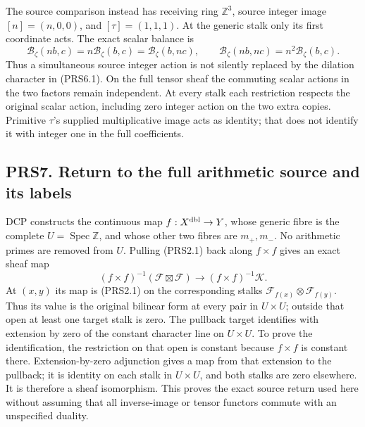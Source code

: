 The source comparison instead has receiving ring \(\mathbb Z^3\), source
integer image \([n]=(n,0,0)\), and \([\tau]=(1,1,1)\). At the generic
stalk only its first coordinate acts. The exact scalar balance is \[
\mathcal B_\zeta(nb,c)=n\mathcal B_\zeta(b,c)=\mathcal B_\zeta(b,nc),\qquad
\mathcal B_\zeta(nb,nc)=n^2\mathcal B_\zeta(b,c).
\tag{PRS6.2}
\] Thus a simultaneous source integer action is not silently replaced by
the dilation character in (PRS6.1). On the full tensor sheaf the
commuting scalar actions in the two factors remain independent. At every
stalk each restriction respects the original scalar action, including
zero integer action on the two extra copies. Primitive \(\tau\)'s
supplied multiplicative image acts as identity; that does not identify
it with integer one in the full coefficients.

\subsection{PRS7. Return to the full arithmetic source and its
labels}\label{prs7.-return-to-the-full-arithmetic-source-and-its-labels}

DCP constructs the continuous map \(f:X^{\rm dbl}\to Y\), whose generic
fibre is the complete \(U=\operatorname{Spec}\mathbb Z\), and whose
other two fibres are \(m_+,m_-\). No arithmetic primes are removed from
\(U\). Pulling (PRS2.1) back along \(f\times f\) gives an exact sheaf
map \[
(f\times f)^{-1}(\mathcal F\boxtimes\mathcal F)
\longrightarrow(f\times f)^{-1}\mathcal K.
\tag{PRS7.1}
\] At \((x,y)\) its map is (PRS2.1) on the corresponding stalks
\(\mathcal F_{f(x)}\otimes\mathcal F_{f(y)}\). Thus its value is the
original bilinear form at every pair in \(U\times U\); outside that open
at least one target stalk is zero. The pullback target identifies with
extension by zero of the constant character line on \(U\times U\). To
prove the identification, the restriction on that open is constant
because \(f\times f\) is constant there. Extension-by-zero adjunction
gives a map from that extension to the pullback; it is identity on each
stalk in \(U\times U\), and both stalks are zero elsewhere. It is
therefore a sheaf isomorphism. This proves the exact source return used
here without assuming that all inverse-image or tensor functors commute
with an unspecified duality.

